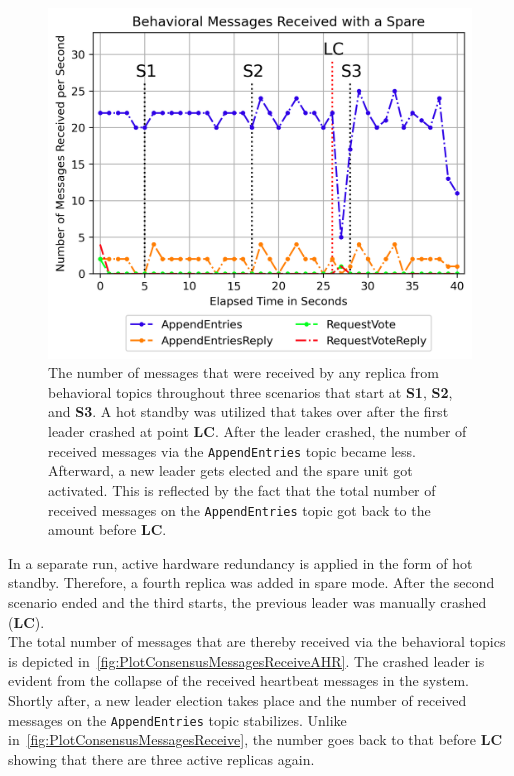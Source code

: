\begin{figure}[!hb]
	\centering
	\includegraphics[width=0.8\linewidth]{images/plots/ConsensusMessagesReceiveAHR}
	\caption{The number of messages that were received by any replica from behavioral topics throughout three scenarios that start at \textbf{S1}, \textbf{S2}, and \textbf{S3}. A hot standby was utilized that takes over after the first leader crashed at point \textbf{LC}. After the leader crashed, the number of received messages via the \texttt{AppendEntries} topic became less. Afterward, a new leader gets elected and the spare unit got activated. This is reflected by the fact that the total number of received messages on the \texttt{AppendEntries} topic got back to the amount before \textbf{LC}.}
	\label{fig:PlotConsensusMessagesReceiveAHR}
\end{figure}

In a separate run, active hardware redundancy is applied in the form of hot standby.
Therefore, a fourth replica was added in spare mode.
After the second scenario ended and the third starts, the previous leader was manually crashed (\textbf{LC}).
\\

The total number of messages that are thereby received via the behavioral topics is depicted in~\autoref{fig:PlotConsensusMessagesReceiveAHR}.
The crashed leader is evident from the collapse of the received heartbeat messages in the system.
Shortly after, a new leader election takes place and the number of received messages on the \texttt{AppendEntries} topic stabilizes.
Unlike in~\autoref{fig:PlotConsensusMessagesReceive}, the number goes back to that before \textbf{LC} showing that there are three active replicas again.


